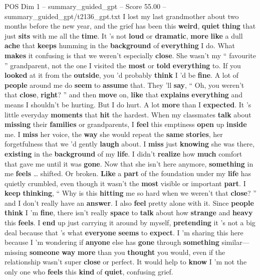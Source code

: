 \begin{textsample}{POS Dim 1 – summary\_guided\_gpt – Score 55.00 – summary\_guided\_gpt/t2136\_gpt.txt}  \label{ex:f1_pos_021}
I lost my last grandmother about two months before the new year, and the grief has been this \textbf{weird}, \textbf{quiet} \textbf{thing} that just \textbf{sits} with me all the \textbf{time}.
It ’s not \textbf{loud} or \textbf{dramatic}, \textbf{more} \textbf{like} a dull \textbf{ache} that \textbf{keeps} humming in the \textbf{background} of \textbf{everything} I do.
What \textbf{makes} it confusing is that we weren't especially \textbf{close}.
She wasn't my “ favourite ” grandparent, not the one I visited the \textbf{most} or \textbf{told} \textbf{everything} to.
If you \textbf{looked} at it from the \textbf{outside}, you ’d probably \textbf{think} I ’d be \textbf{fine}.
A lot of \textbf{people} around me do \textbf{seem} to \textbf{assume} that.
They ’ll \textbf{say}, “ Oh, you weren't that \textbf{close}, \textbf{right}? ” and then \textbf{move} on, \textbf{like} that \textbf{explains} \textbf{everything} and means I shouldn't be hurting.
But I do hurt.
A lot \textbf{more} than I \textbf{expected}.
It ’s little everyday \textbf{moments} that \textbf{hit} the hardest.
When my classmates \textbf{talk} about \textbf{missing} their \textbf{families} or grandparents, I \textbf{feel} this emptiness \textbf{open} up \textbf{inside} me.
I \textbf{miss} her voice, the \textbf{way} she would repeat the \textbf{same} \textbf{stories}, her forgetfulness that we ’d gently \textbf{laugh} about.
I \textbf{miss} just \textbf{knowing} she was there, \textbf{existing} in the \textbf{background} of my \textbf{life}.
I didn't \textbf{realize} how \textbf{much} comfort that gave me until it was \textbf{gone}.
Now that she isn't here anymore, \textbf{something} in me \textbf{feels} … shifted.
Or broken. \textbf{Like} a \textbf{part} of the foundation under my \textbf{life} has quietly crumbled, even though it wasn't the \textbf{most} visible or important \textbf{part}.
I \textbf{keep} \textbf{thinking}, “ Why is this \textbf{hitting} me so hard when we weren't that \textbf{close}? ” and I don't really have an \textbf{answer}.
I also \textbf{feel} pretty alone with it.
Since \textbf{people} \textbf{think} I ’m \textbf{fine}, there isn't really \textbf{space} to \textbf{talk} about how \textbf{strange} and \textbf{heavy} this \textbf{feels}.
I \textbf{end} up just carrying it around by myself, \textbf{pretending} it ’s not a big deal because that ’s what \textbf{everyone} \textbf{seems} to \textbf{expect}.
I ’m sharing this here because I ’m wondering if \textbf{anyone} else has \textbf{gone} through \textbf{something} similar—missing \textbf{someone} \textbf{way} \textbf{more} than you \textbf{thought} you would, even if the relationship wasn't super \textbf{close} or perfect.
It would help to \textbf{know} I ’m not the only one who \textbf{feels} this \textbf{kind} of \textbf{quiet}, confusing grief.


\end{textsample}
